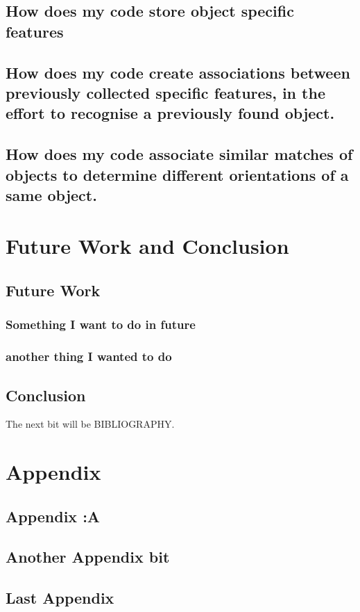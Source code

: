 \documentclass[12pt]{utscapstone}
\begin{document}
\section{How does my code store object specific features}
\label{featurestoring}

\section{How does my code create associations between previously collected specific features, in the effort to recognise a previously found object.}
\label{associatedfeatures}

\section{How does my code associate similar matches of objects to determine different orientations of a same object.}
\label{objectsimilarityhigherlevel}

\chapter{Future Work and Conclusion}

\section{Future Work}
\label{futurework}

\subsection{Something I want to do in future}

\subsection{another thing I wanted to do}

\section{Conclusion}
\label{conclusion}

The next bit will be BIBLIOGRAPHY.




\chapter{Appendix}
\section{Appendix :A}
\label{app:firstpart}

\section{Another Appendix bit}
\label{simulationplots}


\section{Last Appendix}
\end{document}
